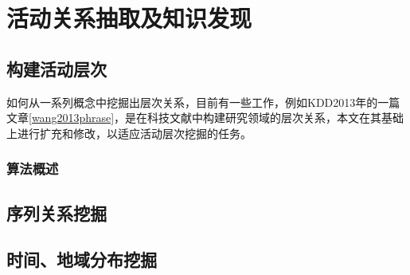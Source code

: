 \chapter{活动关系抽取及知识发现}
\section{构建活动层次}
如何从一系列概念中挖掘出层次关系，目前有一些工作，例如KDD2013年的一篇文章\ref{wang2013phrase}，是在科技文献中构建研究领域的层次关系，本文在其基础上进行扩充和修改，以适应活动层次挖掘的任务。

\subsection{算法概述}



\section{序列关系挖掘}
\section{时间、地域分布挖掘}
